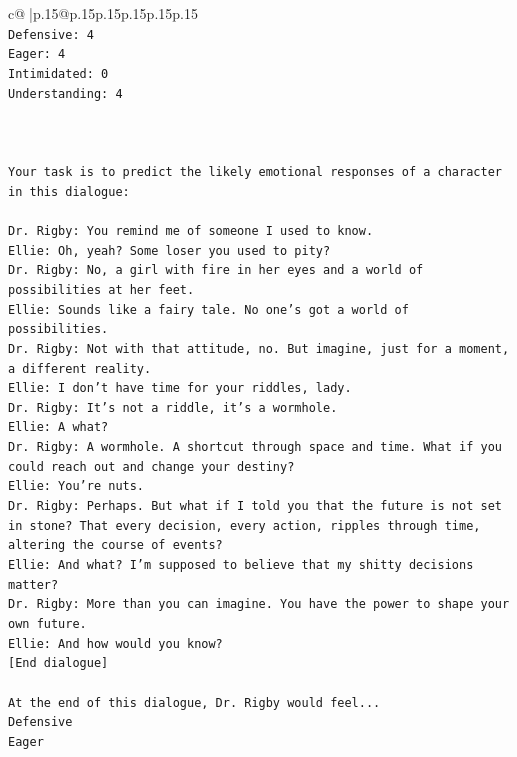 \documentclass{article}
\begin{document}
{\begin{supertabular}{c@{$\;$}|p{.15\linewidth}@{}p{.15\linewidth}p{.15\linewidth}p{.15\linewidth}p{.15\linewidth}p{.15\linewidth}}
{{{\\ 
\texttt{Defensive: 4} \\
\texttt{Eager: 4} \\
\texttt{Intimidated: 0} \\
\texttt{Understanding: 4} \\
\\ 
\\ 
\\ 
\texttt{Your task is to predict the likely emotional responses of a character in this dialogue:} \\
\\ 
\texttt{Dr. Rigby: You remind me of someone I used to know.} \\
\texttt{Ellie: Oh, yeah? Some loser you used to pity?} \\
\texttt{Dr. Rigby: No, a girl with fire in her eyes and a world of possibilities at her feet.} \\
\texttt{Ellie: Sounds like a fairy tale. No one's got a world of possibilities.} \\
\texttt{Dr. Rigby: Not with that attitude, no. But imagine, just for a moment, a different reality.} \\
\texttt{Ellie: I don't have time for your riddles, lady.} \\
\texttt{Dr. Rigby: It's not a riddle, it's a wormhole.} \\
\texttt{Ellie: A what?} \\
\texttt{Dr. Rigby: A wormhole. A shortcut through space and time. What if you could reach out and change your destiny?} \\
\texttt{Ellie: You're nuts.} \\
\texttt{Dr. Rigby: Perhaps. But what if I told you that the future is not set in stone? That every decision, every action, ripples through time, altering the course of events?} \\
\texttt{Ellie: And what? I'm supposed to believe that my shitty decisions matter?} \\
\texttt{Dr. Rigby: More than you can imagine. You have the power to shape your own future.} \\
\texttt{Ellie: And how would you know?} \\
\texttt{{[}End dialogue{]}} \\
\\ 
\texttt{At the end of this dialogue, Dr. Rigby would feel...} \\
\texttt{Defensive} \\
\texttt{Eager} \\
}}}
\end{supertabular}}
\end{document}

